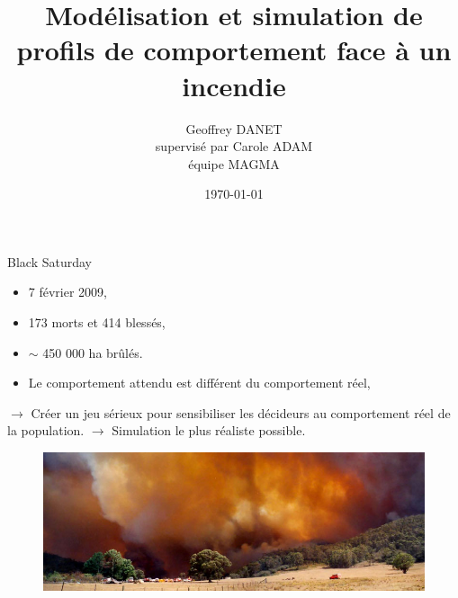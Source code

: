 \documentclass{beamer}
\title{Modélisation et simulation de profils de comportement face à un incendie}
\author{Geoffrey DANET\\ supervisé par Carole ADAM\\équipe MAGMA}
\date{\today}
\begin{document}
    \begin{frame}
        \titlepage
    \end{frame}

    \begin{frame}{Black Saturday}
            \begin{itemize}
                \item 7 février 2009,
                \item 173 morts et 414 blessés,
                \item \begin{math}\sim\end{math} 450 000 ha brûlés.
                \item Le comportement attendu est différent du comportement réel,
            \end{itemize}
        $\rightarrow$ Créer un jeu sérieux pour sensibiliser les décideurs au comportement réel de la population.
        \newline
        $\rightarrow$ Simulation le plus réaliste possible.
        \begin{figure}[h]
            \includegraphics[scale=0.4]{canberra-2003-cropped.jpg}
        \end{figure}
    \end{frame}
\end{document}
